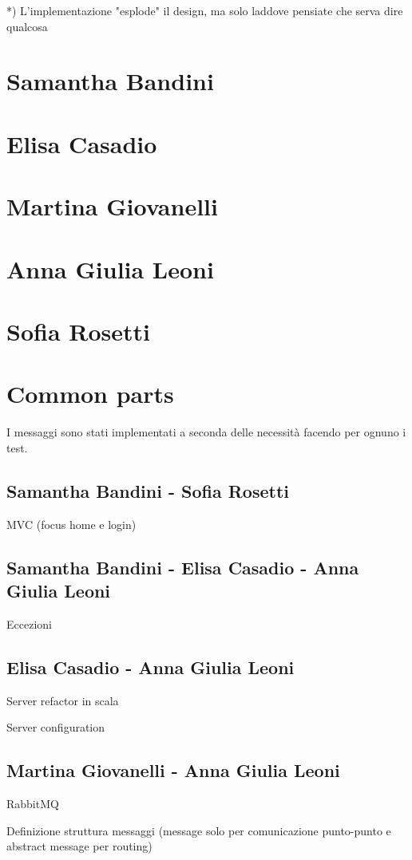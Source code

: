 \documentclass[a4paper,12pt]{report}
\begin{document}
*) L'implementazione "esplode" il design, ma solo laddove pensiate che serva dire qualcosa

\section{Samantha Bandini}
\section{Elisa Casadio}
\section{Martina Giovanelli}
\section{Anna Giulia Leoni}
\section{Sofia Rosetti}

\section{Common parts}
I messaggi sono stati implementati a seconda delle necessità facendo per ognuno i test.

\subsection{Samantha Bandini - Sofia Rosetti}
MVC (focus home e login)

\subsection{Samantha Bandini - Elisa Casadio - Anna Giulia Leoni}
Eccezioni

\subsection{Elisa Casadio - Anna Giulia Leoni}
Server refactor in scala

Server configuration

\subsection{Martina Giovanelli - Anna Giulia Leoni}
RabbitMQ

Definizione struttura messaggi (message solo per comunicazione punto-punto e abstract message per routing)
\end{document}
